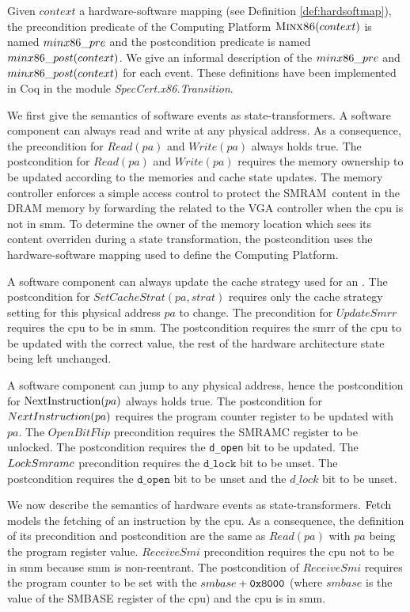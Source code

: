 \label{page:minx86def} Given $context$ a hardware-software mapping (see
Definition \ref{def:hardsoftmap}), the precondition predicate of the Computing
Platform $\textsc{Minx86}(context)$ is named $min\-x86\_pre$ and the
postcondition predicate is named $min\-x86\_post(con\-text)$.
%
We give an informal description of the $min\-x86\_pre$ and
$minx\-86\_post(context)$ for each event.
%
These definitions have been implemented in Coq in the module
\emph{Spec\-Cert.x86.Transi\-tion}.

We first give the semantics of software events as state-transformers.
%
A software component can always read and write at any physical address.
%
As a consequence, the precondition for $Read(pa)$ and $Write(pa)$ always holds
true.
%
The postcondition for $Read(pa)$ and $Write(pa)$ requires the memory ownership
to be updated according to the memories and cache state updates.
%
The memory controller enforces a simple access control to protect the
SMRAM content in the DRAM memory by forwarding the related \IO to the VGA
controller when the \ac{cpu} is not in \ac{smm}.
%
To determine the owner of the memory location which sees its content overriden
during a state transformation, the postcondition uses the hardware-software
mapping used to define the Computing Platform.

A software component can always update the cache strategy used for an \IO.
%
The postcondition for $SetCacheStrat(pa,strat)$ requires only the cache strategy
setting for this physical address $pa$ to change.
%
The precondition for $UpdateSmrr$ requires the \ac{cpu} to be in \ac{smm}.
%
The postcondition requires the \ac{smrr} of the \ac{cpu} to be updated with the
correct value, the rest of the hardware architecture state being left unchanged.

A software component can jump to any physical address, hence the postcondition
for $\mathrm{NextInstru\-ction}(pa)$ always holds true.
%
The postcondition for $NextInstru\-ction(pa)$ requires the program counter
register to be updated with $pa$. The $OpenBitFlip$ precondition requires the
SMRAMC register to be unlocked. The postcondition requires the \texttt{d\_open}
bit to be updated. The $Lock\-Smramc$ precondition requires the
$\texttt{d\_lock}$ bit to be unset. The postcondition requires the
$\texttt{d\_open}$ bit to be unset and the $d\_lock$ bit to be unset.

We now describe the semantics of hardware events as state-transformers.
%
$\mathrm{Fetch}$ models the fetching of an instruction by the \ac{cpu}.
%
As a consequence, the definition of its precondition and postcondition are the
same as $Read(pa)$ with $pa$ being the program register value.
%
$ReceiveSmi$ precondition requires the \ac{cpu} not to be in \ac{smm} because
\ac{smm} is non-reentrant.
%
The postcondition of $ReceiveSmi$ requires the program counter to be set with
the $smbase + \mathtt{0x8000}$ (where $smbase$ is the value of the SMBASE register
of the \ac{cpu}) and the \ac{cpu} is in \ac{smm}.

